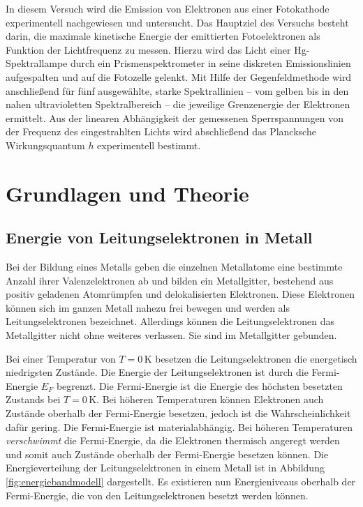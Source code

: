 \documentclass[12pt,a4paper,titlepage]{scrartcl}
\numberwithin{equation}{section}
\numberwithin{table}{section}
\numberwithin{figure}{section}
\begin{document}
In diesem Versuch wird die Emission von Elektronen aus einer Fotokathode experimentell nachgewiesen und untersucht. Das Hauptziel des Versuchs besteht darin, die maximale kinetische Energie der emittierten Fotoelektronen als Funktion der Lichtfrequenz zu messen. Hierzu wird das Licht einer Hg-Spektrallampe durch ein Prismenspektrometer in seine diskreten Emissionslinien aufgespalten und auf die Fotozelle gelenkt.  Mit Hilfe der Gegenfeldmethode wird anschließend für fünf ausgewählte, starke Spektrallinien – vom gelben bis in den nahen ultravioletten Spektralbereich – die jeweilige Grenzenergie der Elektronen ermittelt. Aus der linearen Abhängigkeit der gemessenen Sperrspannungen von der Frequenz des eingestrahlten Lichts wird abschließend das Plancksche Wirkungsquantum $h$ experimentell bestimmt.

\section{Grundlagen und Theorie}\label{sec:Grundlagen}


\subsection{Energie von Leitungselektronen in Metall}
Bei der Bildung eines Metalls geben die einzelnen Metallatome eine bestimmte Anzahl ihrer Valenzelektronen
ab und bilden ein Metallgitter, bestehend aus positiv geladenen Atomrümpfen und delokalisierten Elektronen. Diese Elektronen können sich im ganzen Metall nahezu frei bewegen und werden als Leitungselektronen bezeichnet. Allerdings
können die Leitungselektronen das Metallgitter nicht ohne weiteres verlassen.
Sie sind im Metallgitter gebunden.\cite{PAPskript}

Bei einer Temperatur von $T=0\,\text{K}$ besetzen die Leitungselektronen die energetisch niedrigsten Zustände. Die Energie der Leitungselektronen ist durch die Fermi-Energie $E_F$ begrenzt. Die Fermi-Energie ist die Energie des höchsten besetzten Zustands bei $T=0\,\text{K}$. Bei höheren Temperaturen können Elektronen auch Zustände oberhalb der Fermi-Energie besetzen, jedoch ist die Wahrscheinlichkeit dafür gering. Die Fermi-Energie ist materialabhängig. 
Bei höheren Temperaturen \textit{verschwimmt} die Fermi-Energie, da die Elektronen thermisch angeregt werden und somit auch Zustände oberhalb der Fermi-Energie besetzen können. Die Energieverteilung der Leitungselektronen in einem Metall ist in Abbildung \ref{fig:energiebandmodell} dargestellt. Es existieren nun Energieniveaus oberhalb der Fermi-Energie, die von den Leitungselektronen besetzt werden können. 
\end{document}
